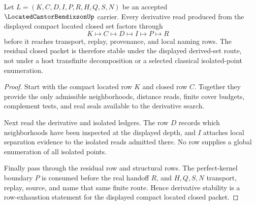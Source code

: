\begin{theorem}
\label{thm:located-cantor-bendixson-derivative-stability}
Let $L=(K,C,D,I,P,R,H,Q,S,N)$ be an accepted $\LocatedCantorBendixsonUp$ carrier. Every derivative read produced from the displayed compact located closed set factors through
$$
K\longmapsto C\longmapsto D\longmapsto I\longmapsto P\longmapsto R
$$
before it reaches transport, replay, provenance, and local naming rows. The residual closed packet is therefore stable under the displayed derived-set route, not under a host transfinite decomposition or a selected classical isolated-point enumeration.
\end{theorem}
\begin{proof}
Start with the compact located row $K$ and closed row $C$. Together they provide the only admissible neighborhoods, distance reads, finite cover budgets, complement tests, and real seals available to the derivative search.

Next read the derivative and isolated ledgers. The row $D$ records which neighborhoods have been inspected at the displayed depth, and $I$ attaches local separation evidence to the isolated reads admitted there. No row supplies a global enumeration of all isolated points.

Finally pass through the residual row and structural rows. The perfect-kernel boundary $P$ is consumed before the real handoff $R$, and $H,Q,S,N$ transport, replay, source, and name that same finite route. Hence derivative stability is a row-exhaustion statement for the displayed compact located closed packet.
\end{proof}




